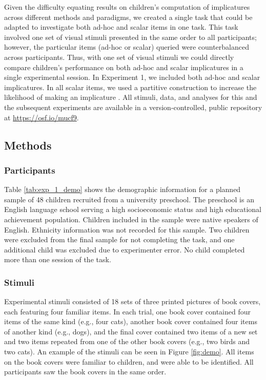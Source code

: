 \documentclass[man]{apa2}
\begin{document}
Given the difficulty equating results on children's computation of implicatures across different methods and paradigms, we created a single task that could be adapted to investigate both ad-hoc and scalar items in one task. This task involved one set of visual stimuli presented in the same order to all participants; however, the particular items (ad-hoc or scalar) queried were counterbalanced across participants. Thus, with one set of visual stimuli we could directly compare children's performance on both ad-hoc and scalar implicatures in a single experimental session. In Experiment 1, we included both ad-hoc and scalar implicatures. In all scalar items, we used a partitive construction to increase the likelihood of making an implicature \cite{degen2015}. All stimuli, data, and analyses for this and the subsequent experiments are available in a version-controlled, public repository at \url{https://osf.io/mucf9}.

\subsection{Methods}

\subsubsection{Participants}

Table \ref{tab:exp_1_demo} shows the demographic information for a planned sample of 48 children recruited from a university preschool. The preschool is an English language school serving a high socioeconomic status and high educational achievement population. Children included in the sample were native speakers of English. Ethnicity information was not recorded for this sample. Two children were excluded from the final sample for not completing the task, and one additional child was excluded due to experimenter error. No child completed more than one session of the task.


\subsubsection{Stimuli}

Experimental stimuli consisted of 18 sets of three printed pictures of book covers, each featuring four familiar items. In each trial, one book cover contained four items of the same kind (e.g., four cats), another book cover contained four items of another kind (e.g., dogs), and the final cover contained two items of a new set and two items repeated from one of the other book covers (e.g., two birds and two cats). An example of the stimuli can be seen in Figure \ref{fig:demo}. All items on the book covers were familiar to children, and were able to be identified. All participants saw the book covers in the same order.
\end{document}
